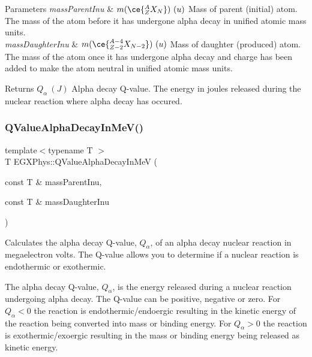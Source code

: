 \begin{DoxyParams}{Parameters}
{\em mass\+Parent\+Inu} & $m(\ce{ ^{A}_{Z}X_{N} })\ (u)$ Mass of parent (initial) atom. The mass of the atom before it has undergone alpha decay in unified atomic mass units. \\
\hline
{\em mass\+Daughter\+Inu} & $m(\ce{ ^{A-4}_{Z{-2}}X_{N-2} })\ (u)$ Mass of daughter (produced) atom. The mass of the atom once it has undergone alpha decay and charge has been added to make the atom neutral in unified atomic mass units. \\
\hline
\end{DoxyParams}
\begin{DoxyReturn}{Returns}
$Q_{\alpha}\ (J)$ Alpha decay Q-\/value. The energy in joules released during the nuclear reaction where alpha decay has occured. 
\end{DoxyReturn}
\mbox{\label{group___e_g_x_phys-_q_value_ga18e054c21cd5f87744e9f5aadc959a54}} 
\subsubsection{\texorpdfstring{Q\+Value\+Alpha\+Decay\+In\+Me\+V()}{QValueAlphaDecayInMeV()}}
{\footnotesize\ttfamily template$<$typename T $>$ \\
T E\+G\+X\+Phys\+::\+Q\+Value\+Alpha\+Decay\+In\+MeV (\begin{DoxyParamCaption}\item[{const T \&}]{mass\+Parent\+Inu,  }\item[{const T \&}]{mass\+Daughter\+Inu }\end{DoxyParamCaption})}



Calculates the alpha decay Q-\/value, $Q_{\alpha}$, of an alpha decay nuclear reaction in megaelectron volts. The Q-\/value allows you to determine if a nuclear reaction is endothermic or exothermic. 

The alpha decay Q-\/value, $Q_{\alpha}$, is the energy released during a nuclear reaction undergoing alpha decay. The Q-\/value can be positive, negative or zero. For $Q_{\alpha} < 0$ the reaction is endothermic/endoergic resulting in the kinetic energy of the reaction being converted into mass or binding energy. For $Q_{\alpha} > 0$ the reaction is exothermic/exoergic resulting in the mass or binding energy being released as kinetic energy.

